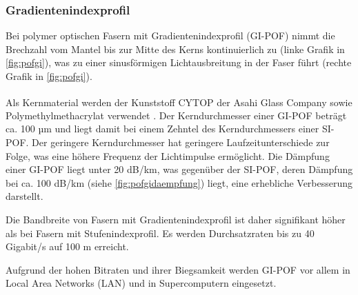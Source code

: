\subsubsection{Gradientenindexprofil}

Bei polymer optischen Fasern mit Gradientenindexprofil (GI-POF) nimmt die
Brechzahl vom Mantel bis zur Mitte des Kerns kontinuierlich zu (linke Grafik in
\autoref{fig:pofgi}), was zu einer sinusförmigen Lichtausbreitung in der Faser
führt (rechte Grafik in \autoref{fig:pofgi}).

Als Kernmaterial werden der Kunststoff CYTOP\textsuperscript{\texttrademark} der
Asahi Glass Company sowie Polymethylmethacrylat verwendet \cite{pofacgif}. Der
Kerndurchmesser einer GI-POF beträgt ca. 100 µm und liegt damit bei einem
Zehntel des Kerndurchmessers einer SI-POF. Der geringere Kerndurchmesser hat
geringere Laufzeitunterschiede zur Folge, was eine höhere Frequenz der
Lichtimpulse ermöglicht. Die Dämpfung einer GI-POF liegt unter 20 dB/km, was
gegenüber der SI-POF, deren Dämpfung bei ca. 100 dB/km (siehe
\autoref{fig:pofgidaempfung}) liegt, eine erhebliche Verbesserung darstellt.

Die Bandbreite von Fasern mit Gradientenindexprofil ist daher signifikant höher
als bei Fasern mit Stufenindexprofil. Es werden Durchsatzraten bis zu 40
Gigabit/s auf 100 m erreicht.

Aufgrund der hohen Bitraten und ihrer Biegsamkeit werden GI-POF vor allem in
\glqq Local Area Networks\grqq{} (LAN) und in Supercomputern eingesetzt.
\cite{poflee}

